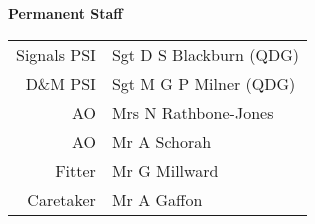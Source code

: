 \vspace*{5mm}

\begin{center}
  \Large
  \textbf{Permanent Staff}
\end{center}

\begin{center}
  \small
  \begin{tabular}{rl}
    Signals PSI & Sgt D S Blackburn (QDG) \\
    D\&M PSI & Sgt M G P Milner (QDG) \\
    AO & Mrs N Rathbone-Jones \\
    AO & Mr A Schorah \\
    Fitter & Mr G Millward \\
    Caretaker & Mr A Gaffon \\
  \end{tabular}
\end{center}
